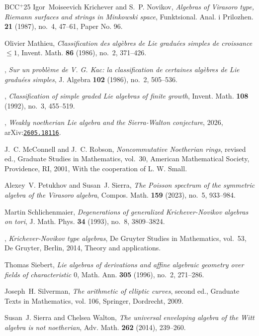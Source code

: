 \documentclass[12pt]{amsart}
\theoremstyle{plain}
\theoremstyle{definition}
\numberwithin{equation}{section}
\newcommand{\etalchar}[1]{$^{#1}$}
\begin{document}
\begin{thebibliography}{BCC{\etalchar{+}}25}
Igor~Moiseevich Krichever and S.~P. Novikov, \emph{Algebras of {V}irasoro type, {R}iemann surfaces and strings in {M}inkowski space}, Funktsional. Anal. i Prilozhen. \textbf{21} (1987), no.~4, 47--61, Paper No. 96.

Olivier Mathieu, \emph{Classification des alg\`ebres de {L}ie gradu\'{e}es simples de croissance {$\leq 1$}}, Invent. Math. \textbf{86} (1986), no.~2, 371--426.

\bysame, \emph{Sur un probl\`eme de {V}. {G}. {K}ac: la classification de certaines alg\`ebres de {L}ie gradu\'{e}es simples}, J. Algebra \textbf{102} (1986), no.~2, 505--536.

\bysame, \emph{Classification of simple graded {L}ie algebras of finite growth}, Invent. Math. \textbf{108} (1992), no.~3, 455--519.

\bysame, \emph{Weakly noetherian {L}ie algebra and the {S}ierra-{W}alton conjecture}, 2026, arXiv:\href{https://arxiv.org/abs/2605.18116}{\texttt{2605.18116}}.

J.~C. McConnell and J.~C. Robson, \emph{Noncommutative {N}oetherian rings}, revised ed., Graduate Studies in Mathematics, vol.~30, American Mathematical Society, Providence, RI, 2001, With the cooperation of L. W. Small.

Alexey~V. Petukhov and Susan~J. Sierra, \emph{The {P}oisson spectrum of the symmetric algebra of the {V}irasoro algebra}, Compos. Math. \textbf{159} (2023), no.~5, 933--984.

Martin Schlichenmaier, \emph{Degenerations of generalized {K}richever-{N}ovikov algebras on tori}, J. Math. Phys. \textbf{34} (1993), no.~8, 3809--3824.

\bysame, \emph{Krichever-{N}ovikov type algebras}, De Gruyter Studies in Mathematics, vol.~53, De Gruyter, Berlin, 2014, Theory and applications.

Thomas Siebert, \emph{Lie algebras of derivations and affine algebraic geometry over fields of characteristic {$0$}}, Math. Ann. \textbf{305} (1996), no.~2, 271--286.

Joseph~H. Silverman, \emph{The arithmetic of elliptic curves}, second ed., Graduate Texts in Mathematics, vol. 106, Springer, Dordrecht, 2009.

Susan~J. Sierra and Chelsea Walton, \emph{The universal enveloping algebra of the {W}itt algebra is not noetherian}, Adv. Math. \textbf{262} (2014), 239--260.

\end{thebibliography}
\end{document}

